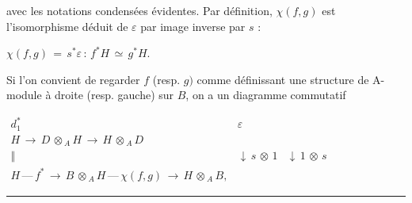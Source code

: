 \documentclass[9pt]{article}
\newcommand{\CanonText}[1]{\par{\fontsize{8.0}{9.35}\selectfont\RaggedRight #1\par}\vspace{2.2pt}}
\newcommand{\CanonDisplay}[1]{\par\vspace{1.2pt}\begin{center}{\fontsize{7.2}{8.4}\selectfont\(\displaystyle #1\)}\end{center}\vspace{1.2pt}}
\newenvironment{CanonMathBlock}{\par\vspace{1.2pt}\begin{center}\fontsize{6.8}{8.0}\selectfont\(\displaystyle}{\)\end{center}\vspace{1.2pt}}
\begin{document}
\begin{minipage}[t][\dimexpr\textheight-5pt\relax][t]{\textwidth}
\CanonText{avec les notations condensées évidentes. Par définition, \(\chi{}(f,g)\) est l'isomorphisme déduit de \(\varepsilon{}\) par image inverse par \(s\) :}
\CanonDisplay{\chi{}(f,g)\,=\,s^{*}\varepsilon{}\,:\,f^{*}H\,\simeq{}\,g^{*}H.}
\CanonText{Si l'on convient de regarder \(f\) (resp. \(g)\) comme définissant une structure de A-module à droite (resp. gauche) sur \(B\), on a un diagramme commutatif}
\begin{CanonMathBlock}
\begin{array}{ccc}
d_{1}^{*} & \varepsilon{} & {}\\
H\,\longrightarrow{}\,D\,\otimes{}_{A}\,H\,\longrightarrow{}\,H\,\otimes{}_{A}\,D & {} & {}\\
\Vert{} & \downarrow{}\,s\,\otimes{}\,1 & \downarrow{}\,1\,\otimes{}\,s\\
H\,\text{---}\,f^{*}\,\longrightarrow{}\,B\,\otimes{}_{A}\,H\,\text{---}\,\chi{}(f,g)\,\longrightarrow{}\,H\,\otimes{}_{A}\,B, & {} & {}
\end{array}
\end{CanonMathBlock}
\vfill
{\color{Accent}\hrule height 0.35pt}\vspace{3pt}
\end{minipage}
\newpage
\end{document}
